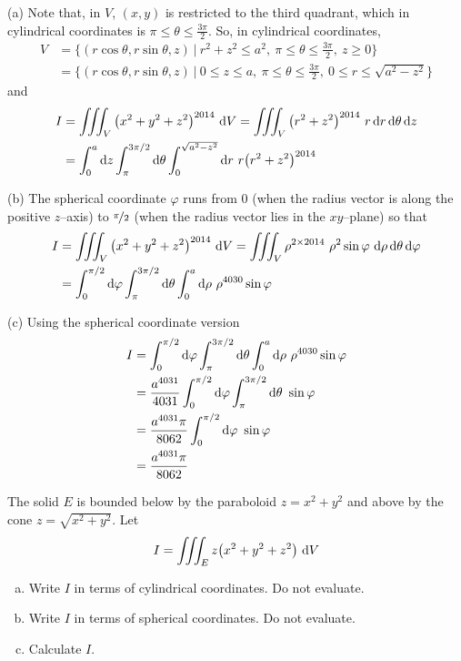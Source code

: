 \begin{solution}
(a) Note that, in $V$, $(x,y)$ is restricted to the third
quadrant, which in cylindrical coordinates 
is $\pi\le\theta\le\frac{3\pi}{2}$. So, in cylindrical coordinates,
\begin{align*}
V&=\Big\{(r\cos\theta,r\sin\theta,z)\ \Big|\ 
          r^2+z^2\le a^2,\ \pi\le\theta\le\frac{3\pi}{2},\ z\ge 0 \Big\} \\
 &=\Big\{(r\cos\theta,r\sin\theta,z)\ \Big|\ 0\le z\le a,\ 
          \pi\le\theta\le\frac{3\pi}{2},\ 0\le r\le\sqrt{a^2-z^2} \Big\}
\end{align*}
and
\begin{align*}
I&= \tripInt_V \big(x^2+y^2+z^2\big)^{2014}\ \dee{V}
  = \tripInt_V \big(r^2+z^2\big)^{2014}\ r\,\dee{r}\,\dee{\theta}\,\dee{z} \\
&=\int_0^a \dee{z}\int_{\pi}^{3\pi/2}\dee{\theta} 
     \int_0^{\sqrt{a^2-z^2}}\dee{r}\ r\big(r^2+z^2\big)^{2014}
\end{align*}

(b) The spherical coordinate $\varphi$ runs from $0$ (when the radius
vector is along the positive $z$--axis)  to $\nicefrac{\pi}{2}$
(when the radius vector lies in the $xy$--plane) so that
\begin{align*}
I&= \tripInt_V \big(x^2+y^2+z^2\big)^{2014}\ \dee{V}
  = \tripInt_V \rho^{2\times 2014}\ \rho^2\sin\varphi\ 
                 \dee{\rho}\,\dee{\theta}\,\dee{\varphi} \\
&=\int_0^{\pi/2} \dee{\varphi}\int_{\pi}^{3\pi/2}\dee{\theta} 
     \int_0^a\dee{\rho}\ \rho^{4030}\sin\varphi
\end{align*}

(c) Using the spherical coordinate version
\begin{align*}
I&=\int_0^{\pi/2} \mathrm{d}\varphi\int_{\pi}^{3\pi/2}\mathrm{d}\theta 
     \int_0^a\mathrm{d}\rho\ \rho^{4030}\sin\varphi \\
 &=\frac{a^{4031}}{4031}
      \int_0^{\pi/2} \mathrm{d}\varphi\int_{\pi}^{3\pi/2}\mathrm{d}\theta 
          \ \sin\varphi \\
 &=\frac{a^{4031}\pi}{8062}
      \int_0^{\pi/2} \mathrm{d}\varphi\ \sin\varphi \\
 &=\frac{a^{4031}\pi}{8062}
\end{align*}
\end{solution}

\begin{question}[M200 2015D] %
The solid $E$ is bounded below by the paraboloid $z = x^2 + y^2$ 
and above by the cone $z=\sqrt{x^2+y^2}$. Let
\begin{equation*}
I = \tripInt_E z\big(x^2+y^2+z^2\big)\ \dee{V}
\end{equation*}
\begin{enumerate}[(a)]
\item
Write $I$ in terms of cylindrical coordinates. Do not evaluate.
\item
Write $I$ in terms of spherical coordinates. Do not evaluate.
\item
Calculate $I$.
\end{enumerate}
\end{question}

